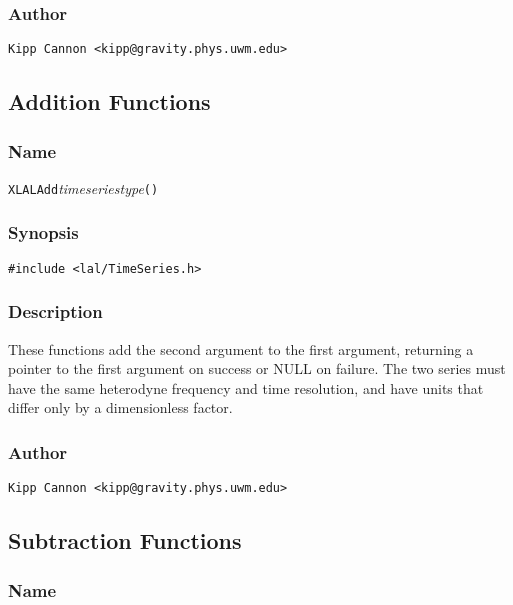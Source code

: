 \subsubsection{Author}

\verb|Kipp Cannon <kipp@gravity.phys.uwm.edu>|


\subsection{Addition Functions}

\subsubsection{Name}

\texttt{XLALAdd}\textit{timeseriestype}\texttt{()}

\subsubsection{Synopsis}

\begin{verbatim}
#include <lal/TimeSeries.h>
\end{verbatim}


\subsubsection{Description}

These functions add the second argument to the first argument, returning a
pointer to the first argument on success or NULL on failure.  The two
series must have the same heterodyne frequency and time resolution, and
have units that differ only by a dimensionless factor.

\subsubsection{Author}

\verb|Kipp Cannon <kipp@gravity.phys.uwm.edu>|


\subsection{Subtraction Functions}

\subsubsection{Name}

